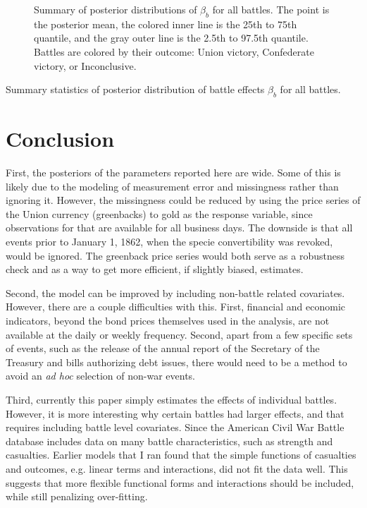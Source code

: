 \documentclass[11pt, oneside, article]{memoir}
\begin{document}
\begin{figure}[htpb]
  \caption{Summary of posterior distributions of $\beta_{b}$ for all battles.
    The point is the posterior mean, the colored inner line is the 25th to 75th quantile, and the gray outer line is the 2.5th to 97.5th quantile.
    Battles are colored by their outcome: Union victory, Confederate victory, or Inconclusive.
  }
  \label{fig:battle_effects}
\end{figure}

\begin{table}
  \caption{Summary statistics of posterior distribution of battle effects $\beta_b$ for all battles.}
  \label{tab:battle_effects}
\end{table}

\section{Conclusion}
\label{sec:conclusion}

First, the posteriors of the parameters reported here are wide.
Some of this is likely due to the modeling of measurement error and missingness rather than ignoring it.
However, the missingness could be reduced by using the price series of the Union currency (greenbacks) to gold as the response variable, since observations for that are available for all business days.
The downside is that all events prior to January 1, 1862, when the specie convertibility was revoked, would be ignored. 
The greenback price series would both serve as a robustness check and as a way to get more efficient, if slightly biased, estimates.

Second, the model can be improved by including non-battle related covariates.
However, there are a couple difficulties with this.
First, financial and economic indicators, beyond the bond prices themselves used in the analysis, are not available at the daily or weekly frequency.
Second, apart from a few specific sets of events, such as the release of the annual report of the Secretary of the Treasury and bills authorizing debt issues, there would need to be a method to avoid an \textit{ad hoc} selection of non-war events.

Third, currently this paper simply estimates the effects of individual battles. 
However, it is more interesting why certain battles had larger effects, and that requires including battle level covariates. 
Since the American Civil War Battle database includes data on many battle characteristics, such as strength and casualties. 
Earlier models that I ran found that the simple functions of casualties and outcomes, e.g. linear terms and interactions, did not fit the data well. 
This suggests that more flexible functional forms and interactions should be included, while still penalizing over-fitting.
\end{document}
